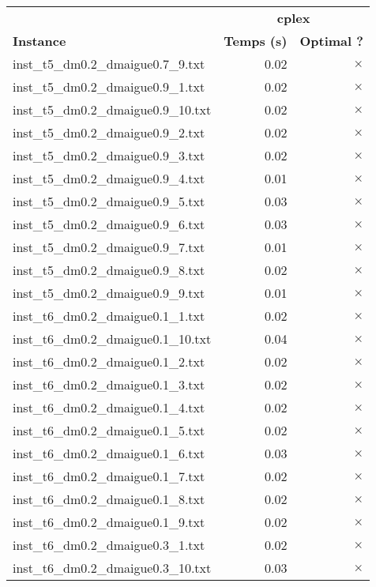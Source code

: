 \documentclass{article}
\begin{document}
\newpage
\begin{center}
\renewcommand{\arraystretch}{1.4} 
 \begin{tabular}{lrr}
	\hline
 & \multicolumn{2}{c}{\textbf{cplex}}\\
\textbf{Instance}  & \textbf{Temps (s)} & \textbf{Optimal ?} \\\hline

inst\_t5\_dm0.2\_dmaigue0.7\_9.txt & 0.02 & 
$\times$
\\
inst\_t5\_dm0.2\_dmaigue0.9\_1.txt & 0.02 & 
$\times$
\\
inst\_t5\_dm0.2\_dmaigue0.9\_10.txt & 0.02 & 
$\times$
\\
inst\_t5\_dm0.2\_dmaigue0.9\_2.txt & 0.02 & 
$\times$
\\
inst\_t5\_dm0.2\_dmaigue0.9\_3.txt & 0.02 & 
$\times$
\\
inst\_t5\_dm0.2\_dmaigue0.9\_4.txt & 0.01 & 
$\times$
\\
inst\_t5\_dm0.2\_dmaigue0.9\_5.txt & 0.03 & 
$\times$
\\
inst\_t5\_dm0.2\_dmaigue0.9\_6.txt & 0.03 & 
$\times$
\\
inst\_t5\_dm0.2\_dmaigue0.9\_7.txt & 0.01 & 
$\times$
\\
inst\_t5\_dm0.2\_dmaigue0.9\_8.txt & 0.02 & 
$\times$
\\
inst\_t5\_dm0.2\_dmaigue0.9\_9.txt & 0.01 & 
$\times$
\\
inst\_t6\_dm0.2\_dmaigue0.1\_1.txt & 0.02 & 
$\times$
\\
inst\_t6\_dm0.2\_dmaigue0.1\_10.txt & 0.04 & 
$\times$
\\
inst\_t6\_dm0.2\_dmaigue0.1\_2.txt & 0.02 & 
$\times$
\\
inst\_t6\_dm0.2\_dmaigue0.1\_3.txt & 0.02 & 
$\times$
\\
inst\_t6\_dm0.2\_dmaigue0.1\_4.txt & 0.02 & 
$\times$
\\
inst\_t6\_dm0.2\_dmaigue0.1\_5.txt & 0.02 & 
$\times$
\\
inst\_t6\_dm0.2\_dmaigue0.1\_6.txt & 0.03 & 
$\times$
\\
inst\_t6\_dm0.2\_dmaigue0.1\_7.txt & 0.02 & 
$\times$
\\
inst\_t6\_dm0.2\_dmaigue0.1\_8.txt & 0.02 & 
$\times$
\\
inst\_t6\_dm0.2\_dmaigue0.1\_9.txt & 0.02 & 
$\times$
\\
inst\_t6\_dm0.2\_dmaigue0.3\_1.txt & 0.02 & 
$\times$
\\
inst\_t6\_dm0.2\_dmaigue0.3\_10.txt & 0.03 & 
$\times$
\\

\end{tabular}
\end{center}
\end{document}
